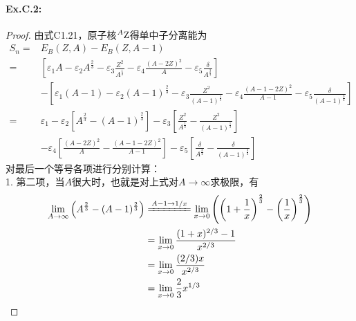 \paragraph*{Ex.C.2:}
\begin{proof}
    由式C1.21，原子核$^{A}{\rm Z}$得单中子分离能为
    \begin{equation*}
        \begin{aligned}
            S_n =& E_B(Z, A) - E_B(Z, A - 1)    \\
                =& \left[ \varepsilon_1 A - \varepsilon_2 A^{\frac{2}{3}}
                  - \varepsilon_3 \frac{Z^2}{A^{\frac{1}{3}}} 
                  - \varepsilon_4 \frac{(A - 2Z)^2}{A}
                  - \varepsilon_5 \frac{\delta}{A^{\frac{3}{4}}}\right] \\
                  &-
                  \left[ \varepsilon_1 (A - 1) - \varepsilon_2 (A - 1)^{\frac{2}{3}}
                  - \varepsilon_3 \frac{Z^2}{(A - 1)^{\frac{1}{3}}} 
                  - \varepsilon_4 \frac{(A - 1 - 2Z)^2}{A - 1}
                  - \varepsilon_5 \frac{\delta}{{(A - 1)}^{\frac{3}{4}}}\right] \\
                =& \varepsilon_1 - \varepsilon_2\left[A^{\frac{2}{3}} - (A - 1)^{\frac{2}{3}}\right]
                  -\varepsilon_3\left[\frac{Z^2}{A^{\frac{1}{3}}} - \frac{Z^2}{(A - 1)^{\frac{1}{3}}}\right] \\
                 & -\varepsilon_4\left[\frac{(A - 2Z)^2}{A} - \frac{(A - 1 - 2Z)^2}{A - 1} \right]
                  -\varepsilon_5\left[\frac{\delta}{A^{\frac{3}{4}}} - \frac{\delta}{{(A - 1)}^{\frac{3}{4}}}\right]
        \end{aligned}
    \end{equation*}
    对最后一个等号各项进行分别计算：\\
    1. 第二项，当$A$很大时，也就是对上式对$A\rightarrow \infty$求极限，有
    \begin{equation}
        \begin{aligned}
            \lim_{A \to \infty} \left(A^{\frac{2}{3}} - (A - 1)^{\frac{2}{3}} \right)
            &\xlongequal[]{A - 1 \to 1/x} \lim_{x \to 0} \left(\left(1 + \frac{1}{x}\right)^{\frac{2}{3}}
            - \left(\frac{1}{x}\right)^{\frac{2}{3}} \right) \\
            &= \lim_{x \to 0} \frac{(1 + x)^{2/3} - 1}{x^{2/3}} \\
            &= \lim_{x \to 0} \frac{(2/3) x}{x^{2/3}} \\
            &= \lim_{x \to 0} \frac{2}{3} x^{1/3}     \\

\end{aligned}
\end{equation}
\end{proof}
